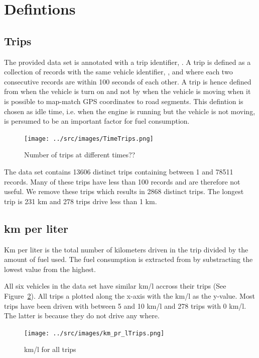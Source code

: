 \section{Defintions}
\subsection{Trips}
The provided data set is annotated with a trip identifier, \tid.
A trip is defined as a collection of records with the same vehicle identifier, \vid, and where each two consecutive records are within 100 seconds of each other.
A trip is hence defined from when the vehicle is turn on and not by when the vehicle is moving when it is possible to map-match GPS coordinates to road segments. 
This defintion is chosen as idle time, i.e. when the engine is running but the vehicle is not moving, is persumed to be an important factor for fuel consumption. 
\begin{figure}[htb]
\centering
\texttt{[image: ../src/images/TimeTrips.png]}
\caption{Number of trips at different times??}
\label{fig:TimeTrips}
\end{figure}


The data set contains 13606 distinct trips containing between 1 and 78511 records. %
Many of these trips have less than 100 records and are therefore not useful. %
We remove these trips which results in 2868 distinct trips. %
The longest trip is 231 km and 278 trips drive less than 1 km. %


\subsection{km per liter}
Km per liter is the total number of kilometers driven in the trip divided by the amount of fuel used.
The fuel consumption is extracted from  by substracting the lowest value from the highest.

All six vehicles in the data set have similar km/l accross their trips (See Figure~\ref{fig:kmlTrips}).
All trips a plotted along the x-axis with the km/l as the y-value.
Most trips have been driven with between 5 and 10 km/l and 278 trips with 0 km/l. %
The latter is because they do not drive any where.
\begin{figure}[htb]
\centering
\texttt{[image: ../src/images/km\_pr\_lTrips.png]}
\caption{km/l for all trips}
\label{fig:kmlTrips}
\end{figure}

